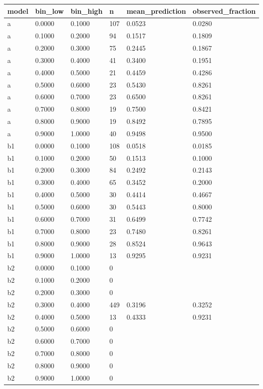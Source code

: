 \begin{tabular}{llllll}
\hline
model & bin\_low & bin\_high & n & mean\_prediction & observed\_fraction \\
\hline
a & 0.0000 & 0.1000 & 107 & 0.0523 & 0.0280 \\
a & 0.1000 & 0.2000 & 94 & 0.1517 & 0.1809 \\
a & 0.2000 & 0.3000 & 75 & 0.2445 & 0.1867 \\
a & 0.3000 & 0.4000 & 41 & 0.3400 & 0.1951 \\
a & 0.4000 & 0.5000 & 21 & 0.4459 & 0.4286 \\
a & 0.5000 & 0.6000 & 23 & 0.5430 & 0.8261 \\
a & 0.6000 & 0.7000 & 23 & 0.6500 & 0.8261 \\
a & 0.7000 & 0.8000 & 19 & 0.7500 & 0.8421 \\
a & 0.8000 & 0.9000 & 19 & 0.8492 & 0.7895 \\
a & 0.9000 & 1.0000 & 40 & 0.9498 & 0.9500 \\
b1 & 0.0000 & 0.1000 & 108 & 0.0518 & 0.0185 \\
b1 & 0.1000 & 0.2000 & 50 & 0.1513 & 0.1000 \\
b1 & 0.2000 & 0.3000 & 84 & 0.2492 & 0.2143 \\
b1 & 0.3000 & 0.4000 & 65 & 0.3452 & 0.2000 \\
b1 & 0.4000 & 0.5000 & 30 & 0.4414 & 0.4667 \\
b1 & 0.5000 & 0.6000 & 30 & 0.5443 & 0.8000 \\
b1 & 0.6000 & 0.7000 & 31 & 0.6499 & 0.7742 \\
b1 & 0.7000 & 0.8000 & 23 & 0.7480 & 0.8261 \\
b1 & 0.8000 & 0.9000 & 28 & 0.8524 & 0.9643 \\
b1 & 0.9000 & 1.0000 & 13 & 0.9295 & 0.9231 \\
b2 & 0.0000 & 0.1000 & 0 &  &  \\
b2 & 0.1000 & 0.2000 & 0 &  &  \\
b2 & 0.2000 & 0.3000 & 0 &  &  \\
b2 & 0.3000 & 0.4000 & 449 & 0.3196 & 0.3252 \\
b2 & 0.4000 & 0.5000 & 13 & 0.4333 & 0.9231 \\
b2 & 0.5000 & 0.6000 & 0 &  &  \\
b2 & 0.6000 & 0.7000 & 0 &  &  \\
b2 & 0.7000 & 0.8000 & 0 &  &  \\
b2 & 0.8000 & 0.9000 & 0 &  &  \\
b2 & 0.9000 & 1.0000 & 0 &  &  \\
\hline
\end{tabular}
